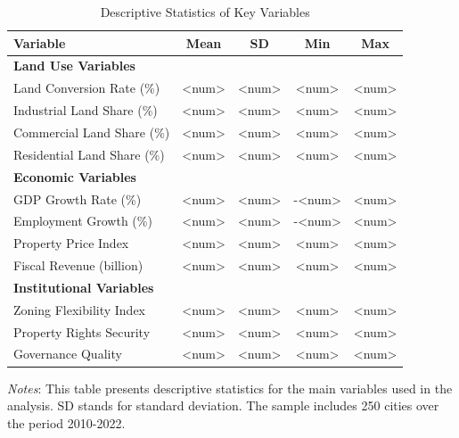 

\begin{table}[ht]
\centering
\caption{Descriptive Statistics of Key Variables}
\label{tab:descriptive}
\begin{tabular}{lcccc}
\toprule
Variable & Mean & SD & Min & Max \\
\midrule
\multicolumn{5}{l}{\textbf{Land Use Variables}} \\
Land Conversion Rate (\%) & <num> & <num> & <num> & <num> \\
Industrial Land Share (\%) & <num> & <num> & <num> & <num> \\
Commercial Land Share (\%) & <num> & <num> & <num> & <num> \\
Residential Land Share (\%) & <num> & <num> & <num> & <num> \\
\midrule
\multicolumn{5}{l}{\textbf{Economic Variables}} \\
GDP Growth Rate (\%) & <num> & <num> & -<num> & <num> \\
Employment Growth (\%) & <num> & <num> & -<num> & <num> \\
Property Price Index & <num> & <num> & <num> & <num> \\
Fiscal Revenue (billion) & <num> & <num> & <num> & <num> \\
\midrule
\multicolumn{5}{l}{\textbf{Institutional Variables}} \\
Zoning Flexibility Index & <num> & <num> & <num> & <num> \\
Property Rights Security & <num> & <num> & <num> & <num> \\
Governance Quality & <num> & <num> & <num> & <num> \\
\bottomrule
\end{tabular}
\begin{tablenotes}
\small
\item \textit{Notes}: This table presents descriptive statistics for the main variables used in the analysis. SD stands for standard deviation. The sample includes 250 cities over the period 2010-2022.
\end{tablenotes}
\end{table}

